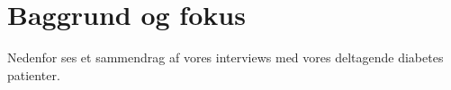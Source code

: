 \section{Baggrund og fokus}
Nedenfor ses et sammendrag af vores interviews med vores deltagende diabetes patienter.


